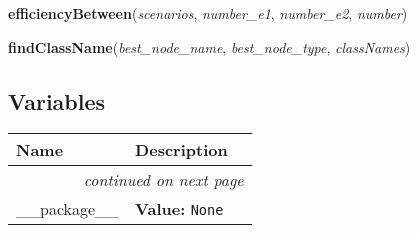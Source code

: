     \label{cost_functions:efficiencyBetween}

    \vspace{0.5ex}

\hspace{.8\funcindent}\begin{boxedminipage}{\funcwidth}

    \raggedright \textbf{efficiencyBetween}(\textit{scenarios}, \textit{number\_e1}, \textit{number\_e2}, \textit{number})

\setlength{\parskip}{2ex}
\setlength{\parskip}{1ex}
    \end{boxedminipage}

    \label{cost_functions:findClassName}

    \vspace{0.5ex}

\hspace{.8\funcindent}\begin{boxedminipage}{\funcwidth}

    \raggedright \textbf{findClassName}(\textit{best\_node\_name}, \textit{best\_node\_type}, \textit{classNames})

\setlength{\parskip}{2ex}
\setlength{\parskip}{1ex}
    \end{boxedminipage}



  \subsection{Variables}

    \vspace{-1cm}
\hspace{\varindent}\begin{longtable}{|p{\varnamewidth}|p{\vardescrwidth}|l}
\cline{1-2}
\cline{1-2} \centering \textbf{Name} & \centering \textbf{Description}& \\
\cline{1-2}
\endhead\cline{1-2}\multicolumn{3}{r}{\small\textit{continued on next page}}\\\endfoot\cline{1-2}
\endlastfoot\raggedright \_\-\_\-p\-a\-c\-k\-a\-g\-e\-\_\-\_\- & \raggedright \textbf{Value:} 
{\tt None}&\\
\cline{1-2}
\end{longtable}

